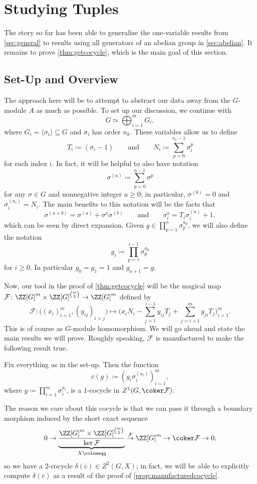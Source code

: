 \documentclass{article}
\numberwithin{equation}{section}
\begin{document}
\section{Studying Tuples} \label{sec:tuplestudy}
The story so far has been able to generalize the one-variable results from \autoref{sec:general} to results using all generators of an abelian group in \autoref{sec:abelian}. It remains to prove \autoref{thm:getcocycle}, which is the main goal of this section.

\subsection{Set-Up and Overview} \label{sec:overview}
The approach here will be to attempt to abstract our data away from the $ G$-module $A$ as much as possible. To set up our discussion, we continue with
\[G\simeq\bigoplus_{i=1}^mG_i,\]
where $G_i=\langle\sigma_i\rangle\subseteq G$ and $\sigma_i$ has order $n_k$. These variables allow us to define
\[T_i\coloneqq(\sigma_i-1)\qquad\text{and}\qquad N_i\coloneqq\sum_{p=0}^{n_i-1}\sigma_i^p\]
for each index $i$. In fact, it will be helpful to also have notation
\[\sigma^{(a)}\coloneqq\sum_{p=0}^{a-1}\sigma^p\]
for any $\sigma\in G$ and nonnegative integer $a\ge0$; in particular, $\sigma^{(0)}=0$ and $\sigma_i^{(n_i)}=N_i$. The main benefits to this notation will be the facts that
\[\sigma^{(a+b)}=\sigma^{(a)}+\sigma^a\sigma^{(b)}\qquad\text{and}\qquad\sigma_i^a=T_i\sigma_i^{(a)}+1,\]
which can be seen by direct expansion. Given $g\in\prod_{p=1}^n\sigma_p^{a_p}$, we will also define the notation
\[g_i\coloneqq\prod_{p=1}^{i-1}\sigma_p^{a_p}\]
for $i\ge0$. In particular $g_0=g_1=1$ and $g_{n+1}=g$.

Now, our tool in the proof of \autoref{thm:getcocycle} will be the magical map $\mathcal F\colon\ZZ[G]^m\times\ZZ[G]^{\binom m2}\to\ZZ[G]^m$ defined by
\[\mathcal F\colon\big((x_i)_{i=1}^m,(y_{ij})_{i>j}\big)\mapsto\Bigg(x_iN_i-\sum_{j=1}^{i-1}y_{ij}T_j+\sum_{j=i+1}^my_{ji}T_j\Bigg)_{i=1}^m.\]
This is of course as $G$-module homomorphism. We will go ahead and state the main results we will prove. Roughly speaking, $\mathcal F$ is manufactured to make the following result true.
\begin{prop} \label{prop:manufacturedcocycle}
	Fix everything as in the set-up. Then the function
	\[\overline c(g)\coloneqq\left(g_i\sigma_i^{(a_i)}\right)_{i=1}^m,\]
	where $g\coloneqq\prod_{i=1}^m\sigma_i^{a_i}$, is a $1$-cocycle in $Z^1(G,\coker\mathcal F)$.
\end{prop}
The reason we care about this cocycle is that we can pass it through a boundary morphism induced by the short exact sequence
\[0\to\underbrace{\frac{\ZZ[G]^m\times\ZZ[G]^{\binom m2}}{\ker\mathcal F}}_{X\coloneqq}\stackrel{\mathcal F}\to\ZZ[G]^m\to\coker\mathcal F\to0,\]
so we have a $2$-cocycle $\delta(\overline c)\in Z^2(G,X)$; in fact, we will be able to explicitly compute $\delta(\overline c)$ as a result of the proof of \autoref{prop:manufacturedcocycle}.
\end{document}
